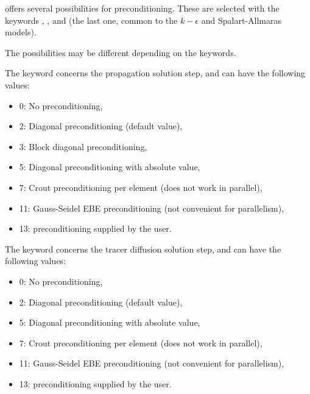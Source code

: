  offers several possibilities for preconditioning.
These are selected with the keywords ,
,
and 
(the last one, common to the $k-\epsilon$ and Spalart-Allmaras models).

The possibilities may be different depending on the keywords.

The keyword  concerns the propagation solution step,
and can have the following values:

\begin{itemize}
\item 0: No preconditioning,

\item 2: Diagonal preconditioning (default value),

\item 3: Block diagonal preconditioning,

\item 5: Diagonal preconditioning with absolute value,

\item 7: Crout preconditioning per element (does not work in parallel),

\item 11: Gauss-Seidel EBE preconditioning
(not convenient for parallelism),

\item 13: preconditioning supplied by the user.
\end{itemize}

The keyword 
concerns the tracer diffusion solution step, and can have the following values:

\begin{itemize}
\item 0: No preconditioning,

\item 2: Diagonal preconditioning (default value),


\item 5: Diagonal preconditioning with absolute value,

\item 7: Crout preconditioning per element (does not work in parallel),

\item 11: Gauss-Seidel EBE preconditioning
(not convenient for parallelism),

\item 13: preconditioning supplied by the user.
\end{itemize}

